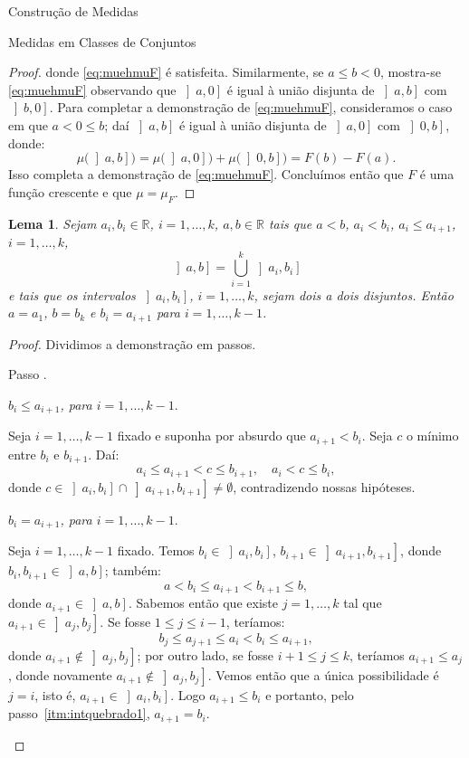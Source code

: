 \documentclass[oneside,final,11pt]{amsbook}
\newcommand{\R}{\mathds R}
\newcounter{contastep}
\newenvironment{stepindent}{\setcounter{contastep}{1}
\begin{list} {Passo \arabic{contastep}.}
{\usecounter{contastep}
\setlength{\leftmargin}{10pt}
\setlength{\rightmargin}{10pt}
\setlength{\labelsep}{5pt}
\setlength{\itemsep}{10pt}
\setlength{\topsep}{10pt}}}
{\end{list}}
\theoremstyle{remark}\newtheorem{exercise}{Exercício}[chapter]
\theoremstyle{remark}\newtheorem{*exercise}[exercise]{\hbox to 0pt{\hskip 0pt minus 1fil*}Exercício}
\theoremstyle{definition}\newtheorem{exdefin}{Definição}[chapter]
\theoremstyle{plain}\newtheorem{teo}{Teorema}[section]
\theoremstyle{plain}\newtheorem{lem}[teo]{Lema}
\theoremstyle{plain}\newtheorem{prop}[teo]{Proposição}
\theoremstyle{plain}\newtheorem{cor}[teo]{Corolário}
\theoremstyle{definition}\newtheorem{defin}[teo]{Definição}
\theoremstyle{remark}\newtheorem{rem}[teo]{Observação}
\theoremstyle{definition}\newtheorem{notation}[teo]{Notação}
\theoremstyle{definition}\newtheorem{convention}[teo]{Convenção}
\theoremstyle{definition}\newtheorem{example}[teo]{Exemplo}
\numberwithin{section}{chapter}
\numberwithin{equation}{section}
\begin{document}
\begin{chapter}{Construção de Medidas}
\begin{section}{Medidas em Classes de Conjuntos}
\begin{proof}
donde \eqref{eq:muehmuF} é satisfeita. Similarmente, se $a\le b<0$, mostra-se \eqref{eq:muehmuF}
observando que $\left]a,0\right]$ é igual à união disjunta de $\left]a,b\right]$ com $\left]b,0\right]$.
Para completar a demonstração de \eqref{eq:muehmuF}, consideramos o caso em que $a<0\le b$; daí
$\left]a,b\right]$ é igual à união disjunta de $\left]a,0\right]$ com $\left]0,b\right]$, donde:
\[\mu\big(\left]a,b\right]\big)=\mu\big(\left]a,0\right]\big)+\mu\big(\left]0,b\right]\big)
=F(b)-F(a).\]
Isso completa a demonstração de \eqref{eq:muehmuF}. Concluímos então que $F$ é uma função crescente e que $\mu=\mu_F$.
\end{proof}

\begin{lem}\label{thm:quaseobvio}
Sejam $a_i,b_i\in\R$, $i=1,\ldots,k$, $a,b\in\R$ tais que $a<b$, $a_i<b_i$, $a_i\le a_{i+1}$, $i=1,\ldots,k$,
\[\left]a,b\right]=\bigcup_{i=1}^k\left]a_i,b_i\right]\]
e tais que os intervalos $\left]a_i,b_i\right]$, $i=1,\ldots,k$, sejam dois a dois disjuntos. Então
$a=a_1$, $b=b_k$ e $b_i=a_{i+1}$ para $i=1,\ldots,k-1$.
\end{lem}
\begin{proof}
Dividimos a demonstração em passos.

\begin{stepindent}
\item\label{itm:intquebrado1}
{\em $b_i\le a_{i+1}$, para $i=1,\ldots,k-1$}.

Seja $i=1,\ldots,k-1$ fixado e suponha por absurdo que $a_{i+1}<b_i$. Seja $c$ o mínimo
entre $b_i$ e $b_{i+1}$. Daí:
\[a_i\le a_{i+1}<c\le b_{i+1},\quad a_i<c\le b_i,\]
donde $c\in\left]a_i,b_i\right]\cap\left]a_{i+1},b_{i+1}\right]\ne\emptyset$, contradizendo nossas hipóteses.

\item {\em $b_i=a_{i+1}$, para $i=1,\ldots,k-1$}.

Seja $i=1,\ldots,k-1$ fixado. Temos $b_i\in\left]a_i,b_i\right]$, $b_{i+1}\in\left]a_{i+1},b_{i+1}\right]$,
donde $b_i,b_{i+1}\in\left]a,b\right]$; também:
\[a<b_i\le a_{i+1}<b_{i+1}\le b,\]
donde $a_{i+1}\in\left]a,b\right]$. Sabemos então que existe $j=1,\ldots,k$ tal que
$a_{i+1}\in\left]a_j,b_j\right]$. Se fosse $1\le j\le i-1$, teríamos:
\[b_j\le a_{j+1}\le a_i<b_i\le a_{i+1},\]
donde $a_{i+1}\not\in\left]a_j,b_j\right]$; por outro lado, se fosse $i+1\le j\le k$, teríamos
$a_{i+1}\le a_j$, donde novamente $a_{i+1}\not\in\left]a_j,b_j\right]$. Vemos então que a única
possibilidade é $j=i$, isto é, $a_{i+1}\in\left]a_i,b_i\right]$. Logo $a_{i+1}\le b_i$
e portanto, pelo passo~\ref{itm:intquebrado1}, $a_{i+1}=b_i$.


\end{stepindent}
\end{proof}
\end{section}
\end{chapter}
\end{document}
